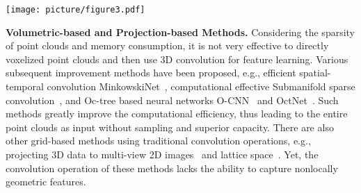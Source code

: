 \documentclass[10pt,twocolumn,letterpaper]{article}
\begin{document}
	
	\begin{figure*}
		\begin{center}
			\begin{center}
				\texttt{[image: picture/figure3.pdf]}
			\end{center}
		\end{center}
		\caption{Part (a) shows adaptive sampling (AS) module, which firstly updates features of grouping point by reasoning group relationship, then normalized weighs re-weight initial sampled points to achieve new sampled points. Part (b) illustrates the construction of local-nonlocal (L-NL) module, which consists of point local cell and point nonlocal cell.  stands for sampled point number,  stands for point number of entire point clouds, , and  stand for channel numbers.}
		\label{fig:ASModule}
		\vspace{-0.3cm}
	\end{figure*}
	{\noindent\bf Volumetric-based and Projection-based Methods.}
	Considering the sparsity of point clouds and memory consumption, it is not very effective to directly voxelized point clouds and then use 3D convolution for feature learning. Various subsequent improvement methods have been proposed, e.g., efficient spatial-temporal convolution MinkowskiNet~\cite{choy20194d}, computational effective Submanifold sparse convolution~\cite{SparseConv}, and Oc-tree based neural networks O-CNN~\cite{wang2017cnn} and OctNet~\cite{riegler2017octnet}. Such methods greatly improve the computational efficiency, thus leading to the entire point clouds as input without sampling and superior capacity. There are also other grid-based methods using traditional convolution operations, e.g., projecting 3D data to multi-view 2D images~\cite{su2015multi} and lattice space~\cite{su2018splatnet}. Yet, the convolution operation of these methods lacks the ability to capture nonlocally geometric features. 
	
\end{document}
